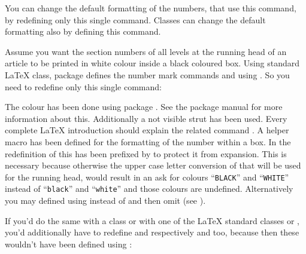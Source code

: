 You can change the default formatting of the numbers, that use this command,
by redefining only this single command. Classes can change the default
formatting also by defining this command.%
%
\begin{Example}
  Assume you want the section numbers of all levels at the running head of
  an article to be printed in white colour inside a black coloured box. Using
  standard \LaTeX{}  class, package  defines
  the number mark commands  and
   using . So you need to
  redefine only this single command:
  The colour has been done using package
  . See the package manual for more
  information about this. Additionally a not visible strut has been
  used. Every complete \LaTeX{} introduction should explain the related
  command . A helper macro  has been defined for
  the formatting of the number within a box. In the redefinition of
   this has been prefixed by
   to protect it from expansion. This is necessary because
  otherwise the upper case letter conversion of  that
  will be used for the running head, would result in an ask for colours
  ``\texttt{BLACK}'' and ``\texttt{WHITE}'' instead of ``\texttt{black}'' and
  ``\texttt{white}'' and those colours are undefined. Alternatively you may
  defined  using  instead of
   and then omit  (see
  \cite{latex:clsguide}).

  If you'd do the same with a \KOMAScript{} class or with one of the \LaTeX{}
  standard classes  or , you'd additionally have to
  redefine  and 
  respectively  and  too,
  because then these wouldn't have been defined using
  :
\end{Example}
